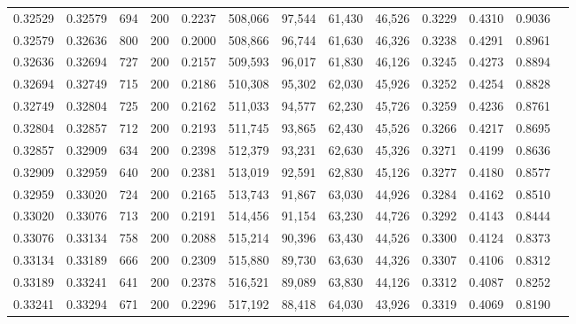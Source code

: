\begin{tabular}{rrrrrrrrrrrrr}
0.32529 & 0.32579 &   694 & 200 &                                     0.2237 & 508,066 &  97,544 &  61,430 &  46,526 & 0.3229 & 0.4310 & 0.9036 \\
0.32579 & 0.32636 &   800 & 200 &                                     0.2000 & 508,866 &  96,744 &  61,630 &  46,326 & 0.3238 & 0.4291 & 0.8961 \\
0.32636 & 0.32694 &   727 & 200 &                                     0.2157 & 509,593 &  96,017 &  61,830 &  46,126 & 0.3245 & 0.4273 & 0.8894 \\
0.32694 & 0.32749 &   715 & 200 &                                     0.2186 & 510,308 &  95,302 &  62,030 &  45,926 & 0.3252 & 0.4254 & 0.8828 \\
0.32749 & 0.32804 &   725 & 200 &                                     0.2162 & 511,033 &  94,577 &  62,230 &  45,726 & 0.3259 & 0.4236 & 0.8761 \\
0.32804 & 0.32857 &   712 & 200 &                                     0.2193 & 511,745 &  93,865 &  62,430 &  45,526 & 0.3266 & 0.4217 & 0.8695 \\
0.32857 & 0.32909 &   634 & 200 &                                     0.2398 & 512,379 &  93,231 &  62,630 &  45,326 & 0.3271 & 0.4199 & 0.8636 \\
0.32909 & 0.32959 &   640 & 200 &                                     0.2381 & 513,019 &  92,591 &  62,830 &  45,126 & 0.3277 & 0.4180 & 0.8577 \\
0.32959 & 0.33020 &   724 & 200 &                                     0.2165 & 513,743 &  91,867 &  63,030 &  44,926 & 0.3284 & 0.4162 & 0.8510 \\
0.33020 & 0.33076 &   713 & 200 &                                     0.2191 & 514,456 &  91,154 &  63,230 &  44,726 & 0.3292 & 0.4143 & 0.8444 \\
0.33076 & 0.33134 &   758 & 200 &                                     0.2088 & 515,214 &  90,396 &  63,430 &  44,526 & 0.3300 & 0.4124 & 0.8373 \\
0.33134 & 0.33189 &   666 & 200 &                                     0.2309 & 515,880 &  89,730 &  63,630 &  44,326 & 0.3307 & 0.4106 & 0.8312 \\
0.33189 & 0.33241 &   641 & 200 &                                     0.2378 & 516,521 &  89,089 &  63,830 &  44,126 & 0.3312 & 0.4087 & 0.8252 \\
0.33241 & 0.33294 &   671 & 200 &                                     0.2296 & 517,192 &  88,418 &  64,030 &  43,926 & 0.3319 & 0.4069 & 0.8190 \\

\end{tabular}

